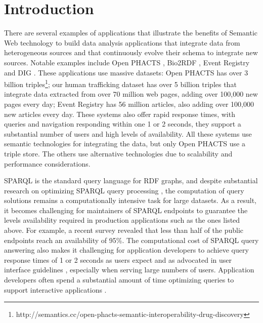 \section{Introduction}
There are several examples of applications that illustrate the benefits of Semantic Web technology to build data analysis applications that integrate data from heterogeneous sources and that continuously evolve their schema to integrate new sources.
Notable examples include Open PHACTS \cite{Groth_Loizou_Gray_Goble_Harland_Pettifer_2014}, Bio2RDF \cite{callahan2013bio2rdf}, Event Registry and DIG \cite{szekely2015building}.
These applications use massive datasets: 
Open PHACTS \cite{Groth_Loizou_Gray_Goble_Harland_Pettifer_2014} has over 3 billion triples\footnote{http://semantics.cc/open-phacts-semantic-interoperability-drug-discovery};
our human trafficking dataset has over 5 billion triples that integrate data extracted from over 70 million web pages, adding over 100,000 new pages every day;
Event Registry has 56 million articles, also adding over 100,000 new articles every day.
These systems also offer rapid response times, with queries and navigation responding within one 1 or 2 seconds, they support a substantial number of users and high levels of availability.
All these systems use semantic technologies for integrating the data, but only Open PHACTS use a triple store.
The others use alternative technologies due to scalability and performance considerations.

SPARQL is the standard query language for RDF graphs, 
and despite substantial research on optimizing SPARQL query processing \cite{Pham2013}, the computation of query solutions remains a computationally intensive task for large datasets.
As a result, it becomes challenging for maintainers of SPARQL endpoints to guarantee the levels availability required in production applications such as the ones listed above.
For example, a recent survey \cite{buil2013sparql} revealed that less than half of the public endpoints reach an availability of 95\%.
The computational cost of SPARQL query answering also makes it challenging for application developers to achieve query response times of 1 or 2 seconds as users expect and as advocated in user interface guidelines \cite{nielsen1994usability}, especially when serving large numbers of users.
Application developers often spend a substantial amount of time optimizing queries to support interactive applications \cite{Loizou_Angles_Groth_2014}.

